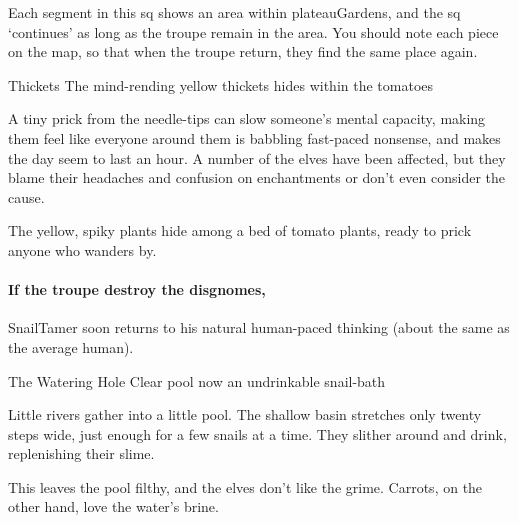 \begin{multicols}{2}




Each \gls{segment} in this \gls{sq} shows an area within \gls{plateauGardens}, and the \gls{sq} `continues' as long as the troupe remain in the \gls{area}.
You should note each piece on the map, so that when the troupe return, they find the same place again.

{ Thickets}%
{The mind-rending yellow thickets hides within the tomatoes}%

A tiny prick from the needle-tips can slow someone's mental capacity, making them feel like everyone around them is babbling fast-paced nonsense, and makes the day seem to last an hour.
A number of the elves have been affected, but they blame their headaches and confusion on enchantments or don't even consider the cause.

The yellow, spiky plants hide among a bed of tomato plants, ready to prick anyone who wanders by.

\paragraph{If the troupe destroy the \glspl{disgnome},}
\gls{SnailTamer} soon returns to his natural human-paced thinking (about the same as the average human).

{The Watering Hole}%
{Clear pool now an undrinkable snail-bath}%

Little rivers gather into a little pool.
The shallow basin stretches only twenty steps wide, just enough for a few snails at a time.
They slither around and drink, replenishing their slime.

This leaves the pool filthy, and the elves don't like the grime.
Carrots, on the other hand, love the water's brine.


\end{multicols}
